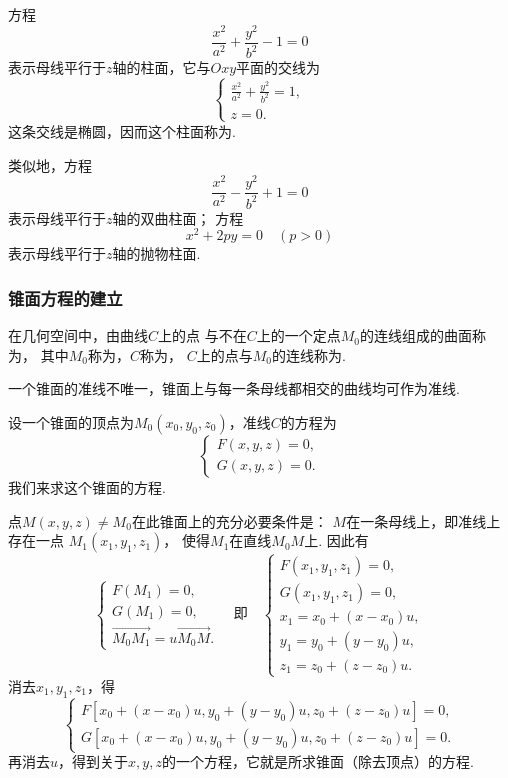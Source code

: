 \begin{example}
方程\[
	\frac{x^2}{a^2} + \frac{y^2}{b^2} - 1 = 0
\]
表示母线平行于\(z\)轴的柱面，它与\(Oxy\)平面的交线为\[
	\left\{ \begin{array}{l}
		\frac{x^2}{a^2} + \frac{y^2}{b^2} = 1, \\
		z = 0.
	\end{array} \right.
\]
这条交线是椭圆，因而这个柱面称为.

类似地，方程\[
	\frac{x^2}{a^2} - \frac{y^2}{b^2} + 1 = 0
\]
表示母线平行于\(z\)轴的双曲柱面；
方程\[
	x^2 + 2py = 0
	\quad(p>0)
\]
表示母线平行于\(z\)轴的抛物柱面.
\end{example}

\subsubsection{锥面方程的建立}
在几何空间中，由曲线\(C\)上的点
与不在\(C\)上的一个定点\(M_0\)的连线组成的曲面称为，
其中\(M_0\)称为，\(C\)称为，
\(C\)上的点与\(M_0\)的连线称为.

一个锥面的准线不唯一，锥面上与每一条母线都相交的曲线均可作为准线.

设一个锥面的顶点为\(M_0(x_0,y_0,z_0)\)，准线\(C\)的方程为\[
	\left\{ \begin{array}{l}
		F(x,y,z) = 0, \\
		G(x,y,z) = 0.
	\end{array} \right.
\]
我们来求这个锥面的方程.

点\(M(x,y,z)\neq M_0\)在此锥面上的充分必要条件是：\allowbreak
\(M\)在一条母线上，即准线上存在一点\break
\(M_1(x_1,y_1,z_1)\)，
使得\(M_1\)在直线\(M_0 M\)上.
因此有\[
	\left\{ \begin{array}{l}
		F(M_1) = 0, \\
		G(M_1) = 0, \\
		\vec{M_0M_1} = u \vec{M_0M}.
	\end{array} \right.
	\quad\text{即}\quad
	\left\{ \begin{array}{l}
		F(x_1,y_1,z_1) = 0, \\
		G(x_1,y_1,z_1) = 0, \\
		x_1 = x_0 + (x - x_0) u, \\
		y_1 = y_0 + (y - y_0) u, \\
		z_1 = z_0 + (z - z_0) u.
	\end{array} \right.
\]
消去\(x_1,y_1,z_1\)，得\[
	\left\{ \begin{array}{l}
		F[x_0 + (x-x_0) u,y_0 + (y-y_0) u, z_0 + (z - z_0) u] = 0, \\
		G[x_0 + (x-x_0) u,y_0 + (y-y_0) u, z_0 + (z - z_0) u] = 0.
	\end{array} \right.
\]
再消去\(u\)，得到关于\(x,y,z\)的一个方程，它就是所求锥面（除去顶点）的方程.

